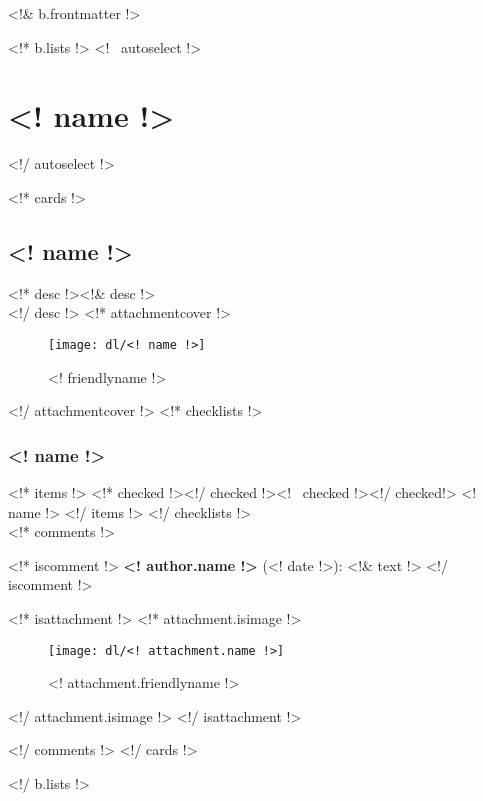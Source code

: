 



\renewcommand{\chaptertitle}{<! b.title !>}
\renewcommand{\today}{FTC Notebook 2015-2016}
\renewcommand{\sectiontitle}{Revision <! b.lastmodified !>}

\setcounter{chapter}{1}
\setcounter{page}{1}
\renewcommand\contentsname{Table of Contents}
\setcounter{tocdepth}{2}
\renewcommand{\sectiontitle}{Table of Contents}
\tableofcontents
\renewcommand{\thesection}{}
\cleardoublepage

<!& b.frontmatter !>

\cleardoublepage
\color{black}

\cleardoublepage
\renewcommand{\chaptertitle}{Engineering Section}
\renewcommand{\today}{\mbox{}}
\renewcommand{\sectiontitle}{Directly from Trello}

<!* b.lists !>
<!~ autoselect !>\section{<! name !>}<!/ autoselect !>

<!* cards !>
\subsection{<! name !>}
<!* desc !><!& desc !>\\<!/ desc !>
<!* attachmentcover !>
\begin{figure}[H]
  \centering
  \texttt{[image: dl/<! name !>]}
  \caption[]{<! friendlyname !>}
  \label{fig:<! name !>}
\end{figure}
<!/ attachmentcover !>
<!* checklists !>
\subsubsection{<! name !>}
<!* items !>
<!* checked !>\boxchecked<!/ checked !><!~ checked !>\boxunchecked<!/ checked!> <! name !>
<!/ items !>
<!/ checklists !>\mbox{}\\


<!* comments !>

<!* iscomment !>
{\bf <! author.name !>} {\color{darkgray} (<! date !>)}: <!& text !>
<!/ iscomment !>

<!* isattachment !>
<!* attachment.isimage !>
\begin{figure}[H]
  \centering
  \texttt{[image: dl/<! attachment.name !>]}
  \caption[]{<! attachment.friendlyname !>}
  \label{fig:<! attachment.name !>}
\end{figure}
<!/ attachment.isimage !>
<!/ isattachment !>

<!/ comments !>
\newpage
\clearpage
<!/ cards !>

<!/ b.lists !>

